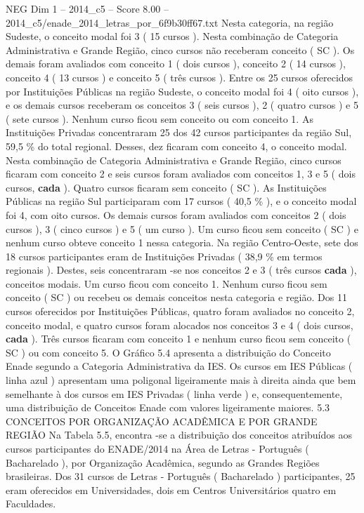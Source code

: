 \begin{textsample}{NEG Dim 1 – 2014\_c5 – Score 8.00 – 2014\_c5/enade\_2014\_letras\_por\_6f9b30ff67.txt}
Nesta categoria, na região Sudeste, o conceito modal foi 3 ( 15 cursos ).
Nesta combinação de Categoria Administrativa e Grande Região, cinco cursos não receberam conceito ( SC ).
Os demais foram avaliados com conceito 1 ( dois cursos ), conceito 2 ( 14 cursos ), conceito 4 ( 13 cursos ) e conceito 5 ( três cursos ).
Entre os 25 cursos oferecidos por Instituições Públicas na região Sudeste, o conceito modal foi 4 ( oito cursos ), e os demais cursos receberam os conceitos 3 ( seis cursos ), 2 ( quatro cursos ) e 5 ( sete cursos ).
Nenhum curso ficou sem conceito ou com conceito 1.
As Instituições Privadas concentraram 25 dos 42 cursos participantes da região Sul, 59,5 \% do total regional.
Desses, dez ficaram com conceito 4, o conceito modal.
Nesta combinação de Categoria Administrativa e Grande Região, cinco cursos ficaram com conceito 2 e seis cursos foram avaliados com conceitos 1, 3 e 5 ( dois cursos, \textbf{cada} ).
Quatro cursos ficaram sem conceito ( SC ).
As Instituições Públicas na região Sul participaram com 17 cursos ( 40,5 \% ), e o conceito modal foi 4, com oito cursos.
Os demais cursos foram avaliados com conceitos 2 ( dois cursos ), 3 ( cinco cursos ) e 5 ( um curso ).
Um curso ficou sem conceito ( SC ) e nenhum curso obteve conceito 1 nessa categoria.
Na região Centro-Oeste, sete dos 18 cursos participantes eram de Instituições Privadas ( 38,9 \% em termos regionais ).
Destes, seis concentraram -se nos conceitos 2 e 3 ( três cursos \textbf{cada} ), conceitos modais.
Um curso ficou com conceito 1.
Nenhum curso ficou sem conceito ( SC ) ou recebeu os demais conceitos nesta categoria e região.
Dos 11 cursos oferecidos por Instituições Públicas, quatro foram avaliados no conceito 2, conceito modal, e quatro cursos foram alocados nos conceitos 3 e 4 ( dois cursos, \textbf{cada} ).
Três cursos ficaram com conceito 1 e nenhum curso ficou sem conceito ( SC ) ou com conceito 5.
O Gráfico 5.4 apresenta a distribuição do Conceito Enade segundo a Categoria Administrativa da IES.
Os cursos em IES Públicas ( linha azul ) apresentam uma poligonal ligeiramente mais à direita ainda que bem semelhante à dos cursos em IES Privadas ( linha verde ) e, consequentemente, uma distribuição de Conceitos Enade com valores ligeiramente maiores. 5.3 CONCEITOS POR ORGANIZAÇÃO ACADÊMICA E POR GRANDE REGIÃO Na Tabela 5.5, encontra -se a distribuição dos conceitos atribuídos aos cursos participantes do ENADE/2014 na Área de Letras - Português ( Bacharelado ), por Organização Acadêmica, segundo as Grandes Regiões brasileiras.
Dos 31 cursos de Letras - Português ( Bacharelado ) participantes, 25 eram oferecidos em Universidades, dois em Centros Universitários quatro em Faculdades.

\end{textsample}
